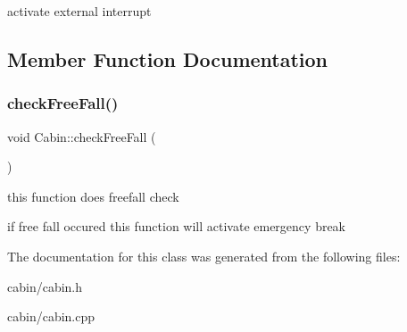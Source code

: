 activate external interrupt 

\subsection{Member Function Documentation}
\mbox{\label{classCabin_a9ed9525eb20ca2140e190375f0baba21}} 
\subsubsection{\texorpdfstring{check\+Free\+Fall()}{checkFreeFall()}}
{\footnotesize\ttfamily void Cabin\+::check\+Free\+Fall (\begin{DoxyParamCaption}{ }\end{DoxyParamCaption})}



this function does freefall check 

if free fall occured this function will activate emergency break 

The documentation for this class was generated from the following files\+:\begin{DoxyCompactItemize}
\item 
cabin/cabin.\+h\item 
cabin/cabin.\+cpp\end{DoxyCompactItemize}
